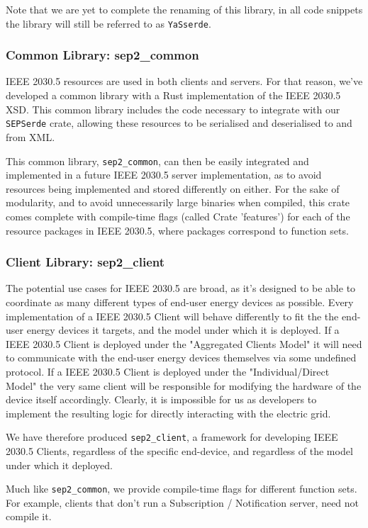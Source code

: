 Note that we are yet to complete the renaming of this library, in all code snippets the library will still be referred to as \texttt{YaSserde}.

\subsubsection{Common Library: \- sep2\_common}
IEEE 2030.5 resources are used in both clients and servers. For that reason, we've developed a common library with a Rust implementation of the IEEE 2030.5 XSD. This common library includes the code necessary to integrate with our \texttt{SEPSerde} crate, allowing these resources to be serialised and deserialised to and from XML.

This common library, \texttt{sep2\_common}, can then be easily integrated and implemented in a future IEEE 2030.5 server implementation, as to avoid resources being implemented and stored differently on either. 
For the sake of modularity, and to avoid unnecessarily large binaries when compiled, this crate comes complete with compile-time flags (called Crate 'features') for each of the resource packages in IEEE 2030.5, where packages correspond to function sets.

\subsubsection{Client Library: \- sep2\_client}
The potential use cases for IEEE 2030.5 are broad, as it's designed to be able to coordinate as many different types of end-user energy devices as possible.
Every implementation of a IEEE 2030.5 Client will behave differently to fit the the end-user energy devices it targets, and the model under which it is deployed. 
If a IEEE 2030.5 Client is deployed under the "Aggregated Clients Model" it will need to communicate with the end-user energy devices themselves via some undefined protocol.
If a IEEE 2030.5 Client is deployed under the "Individual/Direct Model" the very same client will be responsible for modifying the hardware of the device itself accordingly. 
Clearly, it is impossible for us as developers to implement the resulting logic for directly interacting with the electric grid.

We have therefore produced \texttt{sep2\_client}, a framework for developing IEEE 2030.5 Clients, regardless of the specific end-device, and regardless of the model under which it deployed.

Much like \texttt{sep2\_common}, we provide compile-time flags for different function sets. For example, clients that don't run a Subscription / Notification server, need not compile it.

